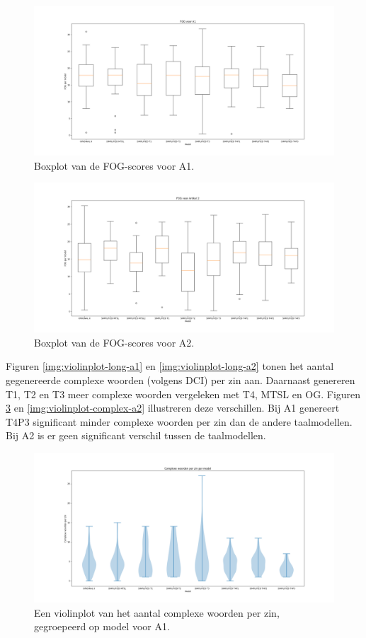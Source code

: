 \begin{figure}
	\includegraphics[width=\linewidth]{img/boxplot-fog-a1.png}
	\caption{Boxplot van de FOG-scores voor A1.}
	\label{img:boxplot-fog-a1}
\end{figure}

\begin{figure}
	\includegraphics[width=\linewidth]{img/boxplot-fog-a2.png}
	\caption{Boxplot van de FOG-scores voor A2.}
	\label{img:boxplot-fog-a2}
\end{figure}

Figuren \ref{img:violinplot-long-a1} en \ref{img:violinplot-long-a2} tonen het aantal gegenereerde complexe woorden (volgens DCI) per zin aan. Daarnaast genereren T1, T2 en T3 meer complexe woorden vergeleken met T4, MTSL en OG. Figuren \ref{img:violinplot-complex-a1} en \ref{img:violinplot-complex-a2} illustreren deze verschillen. Bij A1 genereert T4P3 significant minder complexe woorden per zin dan de andere taalmodellen. Bij A2 is er geen significant verschil tussen de taalmodellen.

\begin{figure}[H]
	\includegraphics[width=\linewidth]{img/violinplot-complex-a1.png}
	\caption{Een violinplot van het aantal complexe woorden per zin, gegroepeerd op model voor A1.}
	\label{img:violinplot-complex-a1}
\end{figure}

